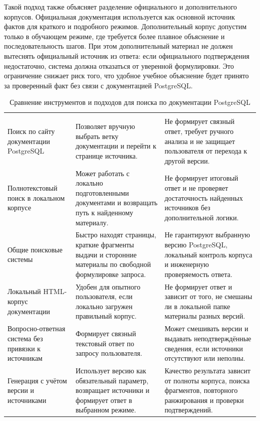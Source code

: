 Такой подход также объясняет разделение официального и дополнительного корпусов. Официальная документация используется как основной источник фактов для краткого и подробного режимов. Дополнительный корпус допустим только в обучающем режиме, где требуется более плавное объяснение и последовательность шагов. При этом дополнительный материал не должен вытеснять официальный источник из ответа: если официального подтверждения недостаточно, система должна отказаться от уверенной формулировки. Это ограничение снижает риск того, что удобное учебное объяснение будет принято за проверенный факт без связи с документацией PostgreSQL.

\begingroup
\centering
\small
{}\selectfont
\setlength{\tabcolsep}{1pt}
\begin{longtable}{|P{0.23\textwidth}|P{0.33\textwidth}|P{0.34\textwidth}|}
\caption{Сравнение инструментов и подходов для поиска по документации PostgreSQL}\label{tab:analysis-competitors}\\
\hline
{} &  &  \\ \hline
\endfirsthead
{}
\hline
{} &  &  \\ \hline
\endhead
\endfoot
Поиск по сайту документации PostgreSQL & Позволяет вручную выбрать ветку документации и перейти к странице источника. & Не формирует связный ответ, требует ручного анализа и не защищает пользователя от перехода к другой версии. \\ \hline
Полнотекстовый поиск в локальном корпусе & Может работать с локально подготовленными документами и возвращать путь к найденному материалу. & Не формирует итоговый ответ и не проверяет достаточность найденных источников без дополнительной логики. \\ \hline
Общие поисковые системы & Быстро находят страницы, краткие фрагменты выдачи и сторонние материалы по свободной формулировке запроса. & Не гарантируют выбранную версию PostgreSQL, локальный контроль корпуса и инженерную проверяемость ответа. \\ \hline
Локальный HTML-корпус документации & Удобен для опытного пользователя, если локально загружен правильный корпус. & Не формирует ответ и зависит от того, не смешаны ли в локальной папке материалы разных версий. \\ \hline
Вопросно-ответная система без привязки к источникам & Формирует связный текстовый ответ по запросу пользователя. & Может смешивать версии и выдавать неподтверждённые сведения, если источники отсутствуют или неполны. \\ \hline
Генерация с учётом версии и источниками & Использует версию как обязательный параметр, возвращает источники и формирует ответ в выбранном режиме. & Качество результата зависит от полноты корпуса, поиска фрагментов, повторного ранжирования и проверки подтверждений. \\ \hline
\end{longtable}
\par\endgroup

